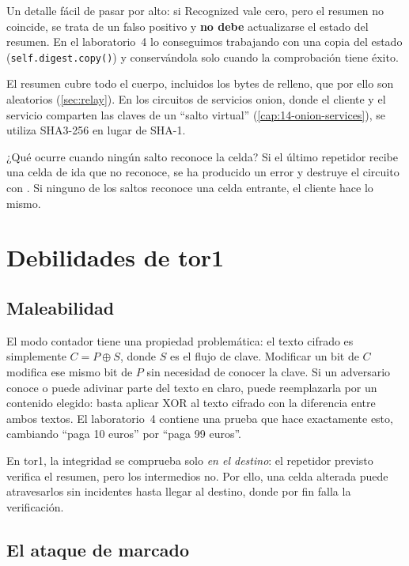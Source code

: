 Un detalle fácil de pasar por alto: si Recognized vale cero, pero el resumen no coincide, se trata de un falso positivo y \textbf{no debe} actualizarse el estado del resumen. En el laboratorio~4 lo conseguimos trabajando con una copia del estado (\texttt{self.digest.copy()}) y conservándola solo cuando la comprobación tiene éxito.

El resumen cubre todo el cuerpo, incluidos los bytes de relleno, que por ello son aleatorios (\cref{sec:relay}). En los circuitos de servicios onion, donde el cliente y el servicio comparten las claves de un \enquote{salto virtual} (\cref{cap:14-onion-services}), se utiliza SHA3-256 en lugar de SHA-1.

¿Qué ocurre cuando ningún salto reconoce la celda? Si el último repetidor recibe una celda de ida que no reconoce, se ha producido un error y destruye el circuito con . Si ninguno de los saltos reconoce una celda entrante, el cliente hace lo mismo.

\section{Debilidades de tor1}\label{sec:tor1-debolezze}

\subsection{Maleabilidad}

El modo contador tiene una propiedad problemática: el texto cifrado es simplemente $C = P \oplus S$, donde $S$ es el flujo de clave. Modificar un bit de $C$ modifica ese mismo bit de $P$ sin necesidad de conocer la clave. Si un adversario conoce o puede adivinar parte del texto en claro, puede reemplazarla por un contenido elegido: basta aplicar XOR al texto cifrado con la diferencia entre ambos textos. El laboratorio~4 contiene una prueba que hace exactamente esto, cambiando \enquote{paga 10 euros} por \enquote{paga 99 euros}.

En tor1, la integridad se comprueba solo \emph{en el destino}: el repetidor previsto verifica el resumen, pero los intermedios no. Por ello, una celda alterada puede atravesarlos sin incidentes hasta llegar al destino, donde por fin falla la verificación.

\subsection{El ataque de marcado}

